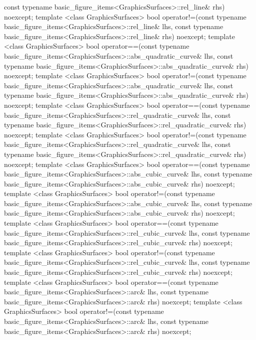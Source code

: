 \begin{codeblock}
{    const typename basic_figure_items<GraphicsSurfaces>::rel_line& rhs) noexcept;
  template <class GraphicsSurfaces>
  bool operator!=(const typename basic_figure_items<GraphicsSurfaces>::rel_line& lhs,
    const typename basic_figure_items<GraphicsSurfaces>::rel_line& rhs) noexcept;
  template <class GraphicsSurfaces>
  bool operator==(const typename basic_figure_items<GraphicsSurfaces>::abs_quadratic_curve& lhs,
    const typename basic_figure_items<GraphicsSurfaces>::abs_quadratic_curve& rhs) noexcept;
  template <class GraphicsSurfaces>
  bool operator!=(const typename basic_figure_items<GraphicsSurfaces>::abs_quadratic_curve& lhs,
    const typename basic_figure_items<GraphicsSurfaces>::abs_quadratic_curve& rhs) noexcept;
  template <class GraphicsSurfaces>
  bool operator==(const typename basic_figure_items<GraphicsSurfaces>::rel_quadratic_curve& lhs,
    const typename basic_figure_items<GraphicsSurfaces>::rel_quadratic_curve& rhs) noexcept;
  template <class GraphicsSurfaces>
  bool operator!=(const typename basic_figure_items<GraphicsSurfaces>::rel_quadratic_curve& lhs,
    const typename basic_figure_items<GraphicsSurfaces>::rel_quadratic_curve& rhs) noexcept;
  template <class GraphicsSurfaces>
  bool operator==(const typename basic_figure_items<GraphicsSurfaces>::abs_cubic_curve& lhs,
    const typename basic_figure_items<GraphicsSurfaces>::abs_cubic_curve& rhs) noexcept;
  template <class GraphicsSurfaces>
  bool operator!=(const typename basic_figure_items<GraphicsSurfaces>::abs_cubic_curve& lhs,
    const typename basic_figure_items<GraphicsSurfaces>::abs_cubic_curve& rhs) noexcept;
  template <class GraphicsSurfaces>
  bool operator==(const typename basic_figure_items<GraphicsSurfaces>::rel_cubic_curve& lhs,
    const typename basic_figure_items<GraphicsSurfaces>::rel_cubic_curve& rhs) noexcept;
  template <class GraphicsSurfaces>
  bool operator!=(const typename basic_figure_items<GraphicsSurfaces>::rel_cubic_curve& lhs,
    const typename basic_figure_items<GraphicsSurfaces>::rel_cubic_curve& rhs) noexcept;
  template <class GraphicsSurfaces>
  bool operator==(const typename basic_figure_items<GraphicsSurfaces>::arc& lhs,
    const typename basic_figure_items<GraphicsSurfaces>::arc& rhs) noexcept;
  template <class GraphicsSurfaces>
  bool operator!=(const typename basic_figure_items<GraphicsSurfaces>::arc& lhs,
    const typename basic_figure_items<GraphicsSurfaces>::arc& rhs) noexcept;
}
\end{codeblock}